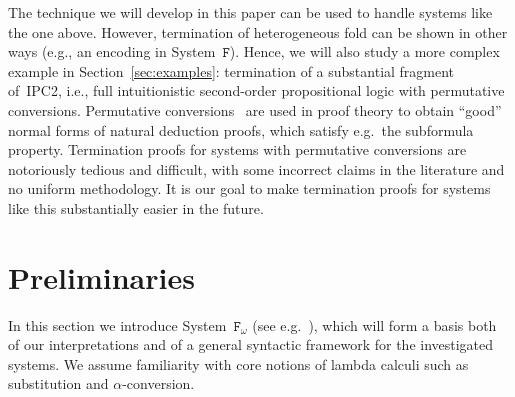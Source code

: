 \documentclass[a4paper,UKenglish,cleveref,autoref,numberwithinsect]{lipics-v2019}
\theoremstyle{definition}
\newcommand{\Fomega}{\mathtt{F}_\omega}
\begin{document}
The technique we will develop in this paper can be used to handle
systems like the one above.  However, termination of heterogeneous
fold can be shown in other ways (e.g., an encoding in
System~$\mathtt{F}$). Hence, we will also study a more complex example
in Section~\ref{sec:examples}: termination of a substantial fragment
of~IPC2, i.e., full intuitionistic second-order propositional logic
with permutative conversions. Permutative
conversions~\cite[Chapter~6]{TroelstraSchwichtenberg1996} are used in
proof theory to obtain ``good'' normal forms of natural deduction
proofs, which satisfy e.g.~the subformula property. Termination proofs
for systems with permutative conversions are notoriously tedious and
difficult, with some incorrect claims in the literature and no uniform
methodology. It is our goal to make termination proofs for systems
like this substantially easier in the future.

\section{Preliminaries}\label{sec_preliminaries}

In this section we introduce System~$\Fomega$ (see
e.g.~\cite[Section~11.7]{SorensenUrzyczyn2006}), which will form a
basis both of our interpretations and of a general syntactic framework
for the investigated systems. We assume familiarity with core notions
of lambda calculi such as substitution and $\alpha$-conversion.
\end{document}
